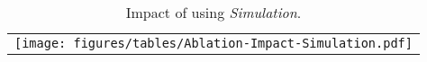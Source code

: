 \begin{table}[h]
    \centering
    \begin{tabular}{c}
    \hspace*{-0.35cm}
    \texttt{[image: figures/tables/Ablation-Impact-Simulation.pdf]}
    \end{tabular}
    \caption{Impact of using \textit{Simulation}.}
    \label{tab:simulation-impact}
\end{table}
